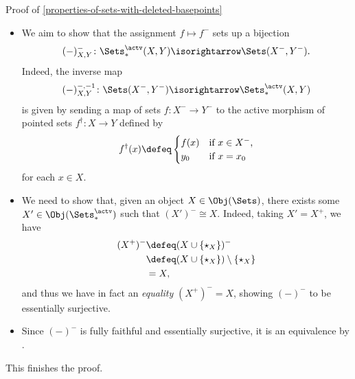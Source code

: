 \begin{Proof}{Proof of \cref{properties-of-sets-with-deleted-basepoints}}
\begin{itemize}
        \item{}We aim to show that the assignment $f\mapsto f^{-}$ sets up a bijection
            \[
                (-)^{-}_{X,Y}%
                \colon%
                \Sets^{\actv}_{*}(X,Y)%
                \isorightarrow%
                \Sets(X^{-},Y^{-}).%
            \]%
            Indeed, the inverse map
            \[
                (-)^{-,-1}_{X,Y}%
                \colon%
                \Sets(X^{-},Y^{-})%
                \isorightarrow%
                \Sets^{\actv}_{*}(X,Y)%
            \]%
            is given by sending a map of sets $f\colon X^{-}\to Y^{-}$ to the active morphism of pointed sets $f^{\dagger}\colon X\to Y$ defined by
            \[
                f^{\dagger}(x)%
                \defeq%
                \begin{cases}
                    f(x)  &\text{if $x\in X^{-}$,}\\
                    y_{0} &\text{if $x=x_{0}$}
                \end{cases}
            \]%
            for each $x\in X$.
        \item{}We need to show that, given an object $X\in\Obj(\Sets)$, there exists some $X'\in\Obj(\Sets^{\actv}_{*})$ such that $(X')^{-}\cong X$. Indeed, taking $X'=X^{+}$, we have
            \begin{align*}
                (X^{+})^{-} &\defeq (X\cup\{\star_{X}\})^{-}\\
                            &\defeq (X\cup\{\star_{X}\})\setminus\{\star_{X}\}\\
                            &=      X,
            \end{align*}
            and thus we have in fact an \emph{equality} $(X^{+})^{-}=X$, showing $(-)^{-}$ to be essentially surjective.
        \item{}Since $(-)^{-}$ is fully faithful and essentially surjective, it is an equivalence by .
    \end{itemize}
    This finishes the proof.


\end{Proof}
